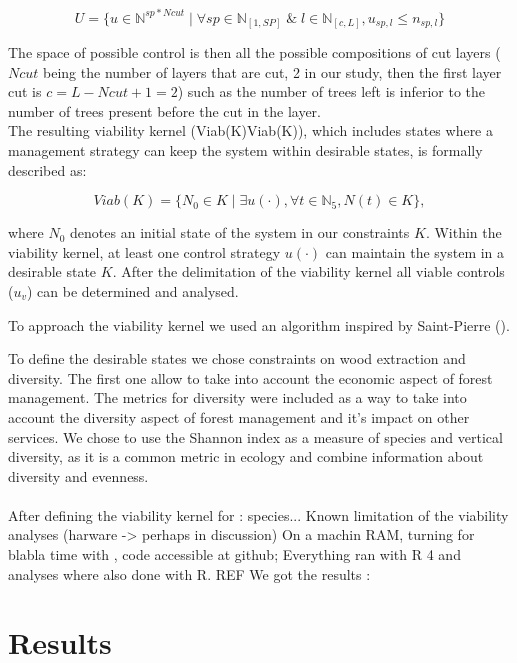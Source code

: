 \documentclass{article}
\begin{document}
\[
     U = \{u \in \mathbb{N}^{sp*Ncut} \mid \forall sp \in \mathbb{N}_{[1,SP]} \; \& \; l \in \mathbb{N}_{[c,L]}, u_{sp,l} \leq n_{sp,l}\}
\]

The space of possible control is then all the possible compositions of cut layers ($Ncut$ being the number of layers that are cut, 2 in our study, then the first layer cut is $c = L-Ncut+1 = 2$) such as the number of trees left is inferior to the number of trees present before the cut in the layer.\\

The resulting viability kernel (Viab(K)Viab(K)), which includes states where a management strategy can keep the system within desirable states, is formally described as:

\[
Viab(K) = \{N_0 \in K \mid\exists u(\cdot), \forall t \in \mathbb{N}_5, N(t) \in K\},
\]

where \(N_0\) denotes an initial state of the system in our constraints $K$. Within the viability kernel, at least one control strategy $u(\cdot)$ can maintain the system in a desirable state $K$. After the delimitation of the viability kernel all viable controls (\(u_v\)) can be determined and analysed.

To approach the viability kernel we used an algorithm inspired by Saint-Pierre (\autocite{saint-pierreApproximationViabilityKernel1994}).

To define the desirable states we chose constraints on wood extraction and diversity. The first one allow to take into account the economic aspect of forest management. The metrics for diversity were included as a way to take into account the diversity aspect of forest management and it's impact on other services. We chose to use the Shannon index as a measure of species and vertical diversity, as it is a common metric in ecology and combine information about diversity and evenness. \\
\\

After defining the viability kernel for : species...
Known limitation of the viability analyses (harware -> perhaps in discussion)
On a machin RAM, turning for blabla time with , code accessible at github; 
Everything ran with R 4 and analyses where also done with R. REF
We got the results :

\section{Results}
\end{document}
